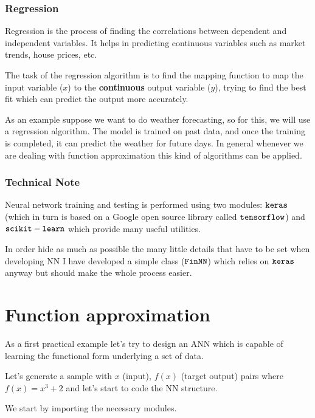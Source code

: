 \subsubsection{Regression}\label{regression}

Regression is the process of finding the correlations between dependent
and independent variables. It helps in predicting continuous
variables such as market trends, house prices, etc.

The task of the regression algorithm is to find the mapping function to
map the input variable (\(x\)) to the \textbf{continuous} output
variable (\(y\)), trying to find the best fit which can predict the
output more accurately.

As an example suppose we want to do weather forecasting, so for this, we will
use a regression algorithm. The model is trained
on past data, and once the training is completed, it can predict the
weather for future days. In general whenever we are dealing with
function approximation this kind of algorithms can be applied.

\subsubsection{Technical Note}\label{technical-note}

Neural network training and testing is performed using two modules:
\(\tt{keras}\) (which in turn is based on a Google open source library
called \(\tt{tensorflow}\)) and \(\tt{scikit-learn}\) which provide many
useful utilities.

In order hide as much as possible the many little details that have to
be set when developing NN I have developed a simple class
(\(\tt{FinNN}\)) which relies on \(\tt{keras}\) anyway but should make
the whole process easier.

\section{Function approximation}\label{function-approximation}

As a first practical example let's try to design an ANN which is capable
of learning the functional form underlying a set of data.

Let's generate a sample with \(x\) (input), \(f(x)\) (target output)
pairs where \(f(x) = x^3 +2\) and let's start to code the NN structure.

We start by importing the necessary modules.

